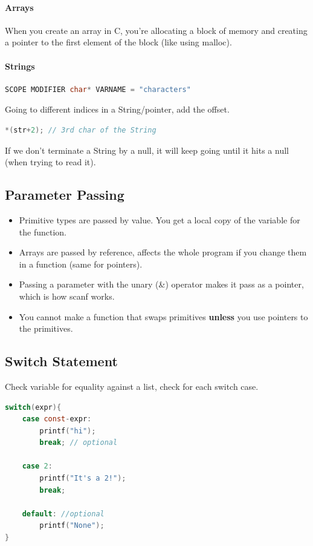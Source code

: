 \documentclass[12 pt]{article}
\begin{document}
\paragraph{Arrays} When you create an array in C, you're allocating a block of memory and creating a pointer to the first element of the block (like using malloc).
\paragraph{Strings}
\begin{lstlisting}[language=c]
SCOPE MODIFIER char* VARNAME = "characters"
\end{lstlisting}
Going to different indices in a String/pointer, add the offset.
\begin{lstlisting}[language=c]
*(str+2); // 3rd char of the String
\end{lstlisting}
If we don't terminate a String by a null, it will keep going until it hits a null
(when trying to read it).
\subsection{Parameter Passing}
\begin{itemize}
\item Primitive types are passed by value. You get a local copy of the variable for the function.
\item Arrays are passed by reference, affects the whole program if you change them in a function (same for pointers).
\item Passing a parameter with the unary (\&) operator makes it pass as a pointer, which is how scanf works.
\item You cannot make a function that swaps primitives \textbf{unless} you use pointers to the primitives.
\end{itemize}
\subsection{Switch Statement}
Check variable for equality against a list, check for each switch case.
\begin{lstlisting}[language=c]
switch(expr){
    case const-expr:
        printf("hi");
        break; // optional

    case 2:
        printf("It's a 2!");
        break;

    default: //optional
        printf("None");
}
\end{lstlisting}
\end{document}
